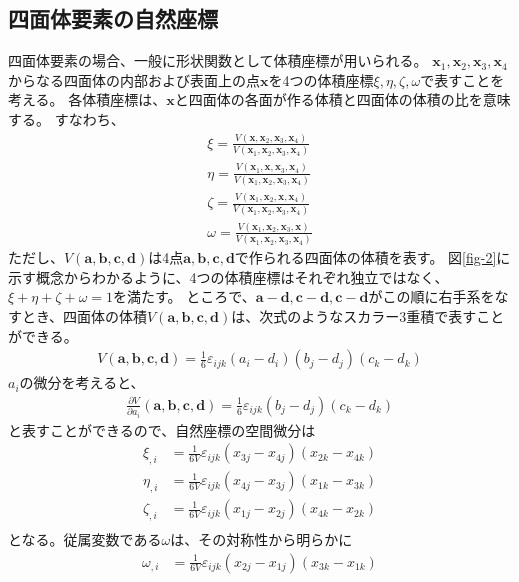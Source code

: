 \documentclass{jarticle}
\begin{document}
\subsection{四面体要素の自然座標}
四面体要素の場合、一般に形状関数として体積座標が用いられる。
$\bm{x}_1, \bm{x}_2, \bm{x}_3, \bm{x}_4$からなる四面体の内部および表面上の点$\bm{x}$を4つの体積座標$\xi, \eta, \zeta,\omega$で表すことを考える。
各体積座標は、$\bm{x}$と四面体の各面が作る体積と四面体の体積の比を意味する。
すなわち、
\begin{align}
  \xi = \frac{V(\bm{x}, \bm{x}_2, \bm{x}_3, \bm{x}_4)}{V(\bm{x}_1, \bm{x}_2, \bm{x}_3, \bm{x}_4)}\\
  \eta = \frac{V(\bm{x}_1, \bm{x}, \bm{x}_3, \bm{x}_4)}{V(\bm{x}_1, \bm{x}_2, \bm{x}_3, \bm{x}_4)}\\
  \zeta = \frac{V(\bm{x}_1, \bm{x}_2, \bm{x}, \bm{x}_4)}{V(\bm{x}_1, \bm{x}_2, \bm{x}_3, \bm{x}_4)}\\
  \omega =\frac{V(\bm{x}_1, \bm{x}_2, \bm{x}_3, \bm{x})}{V(\bm{x}_1, \bm{x}_2, \bm{x}_3, \bm{x}_4)}
\end{align}
ただし、$V(\bm{a}, \bm{b}, \bm{c}, \bm{d})$は4点$\bm{a},\bm{b},\bm{c},\bm{d}$で作られる四面体の体積を表す。
図\ref{fig-2}に示す概念からわかるように、4つの体積座標はそれぞれ独立ではなく、$\xi+\eta+\zeta+\omega=1$を満たす。
ところで、$\bm{a}-\bm{d},\bm{c}-\bm{d},\bm{c}-\bm{d}$がこの順に右手系をなすとき、四面体の体積$V(\bm{a}, \bm{b}, \bm{c}, \bm{d})$は、次式のようなスカラー3重積で表すことができる。
\begin{align}
  V(\bm{a}, \bm{b}, \bm{c}, \bm{d}) = \frac{1}{6}\varepsilon_{ijk}(a_i - d_i)(b_j-d_j)(c_k - d_k)
\end{align}
$a_i$の微分を考えると、
\begin{align}
  \frac{\partial V}{\partial a_i}(\bm{a}, \bm{b}, \bm{c}, \bm{d}) = \frac{1}{6}\varepsilon_{ijk}(b_j-d_j)(c_k - d_k)  
\end{align}
と表すことができるので、自然座標の空間微分は
\begin{align}
  \xi_{,i} &= \frac{1}{6V}\varepsilon_{ijk}(x_{3j} - x_{4j})(x_{2k} - x_{4k})\\
  \eta_{,i} &= \frac{1}{6V}\varepsilon_{ijk}(x_{4j} - x_{3j})(x_{1k} - x_{3k})\\
  \zeta_{,i} &= \frac{1}{6V}\varepsilon_{ijk}(x_{1j} - x_{2j})(x_{4k} - x_{2k})\\
\end{align}
となる。従属変数である$\omega$は、その対称性から明らかに
\begin{align}
  \omega_{,i} &= \frac{1}{6V}\varepsilon_{ijk}(x_{2j} - x_{1j})(x_{3k} - x_{1k})
\end{align}
\end{document}
